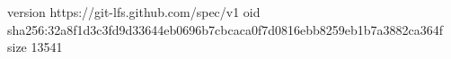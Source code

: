 version https://git-lfs.github.com/spec/v1
oid sha256:32a8f1d3c3fd9d33644eb0696b7cbcaca0f7d0816ebb8259eb1b7a3882ca364f
size 13541
